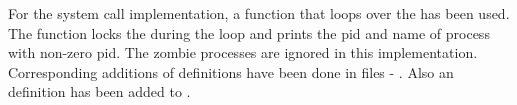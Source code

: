 \documentclass[12pt]{article}
\begin{document}
\vspace{5mm}
\begin{addmargin}[0.1in]{0in}
    For the {} system call implementation, a function that loops over the {} has been used. The function locks the {} during the loop and prints the pid and name of process with non-zero pid. The zombie processes are ignored in this implementation. Corresponding additions of definitions have been done in files - {}. Also an {} definition has been added to {}.
\end{addmargin}
\end{document}
